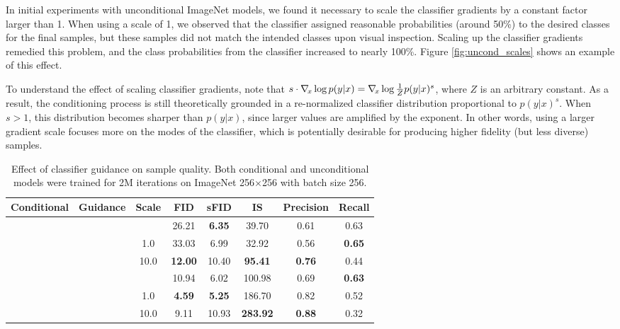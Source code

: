 \documentclass{article}
\newcommand{\cmark}{\ding{51}}%
\newcommand{\xmark}{\ding{55}}
\newcommand{\shortcite}[1]{[\citenum{#1}]}
\begin{document}
In initial experiments with unconditional ImageNet models, we found it necessary to scale the classifier gradients by a constant factor larger than 1. When using a scale of 1, we observed that the classifier assigned reasonable probabilities (around 50\%) to the desired classes for the final samples, but these samples did not match the intended classes upon visual inspection.
Scaling up the classifier gradients remedied this problem, and the class probabilities from the classifier increased to nearly 100\%. Figure \ref{fig:uncond_scales} shows an example of this effect.

To understand the effect of scaling classifier gradients, note that $s \cdot \grad_x \log p(y|x) = \grad_x \log \frac{1}{Z} p(y|x)^s$, where $Z$ is an arbitrary constant. As a result, the conditioning process is still theoretically grounded in a re-normalized classifier distribution proportional to $p(y|x)^s$. When $s > 1$, this distribution becomes sharper than $p(y|x)$, since larger values are amplified by the exponent. In other words, using a larger gradient scale focuses more on the modes of the classifier, which is potentially desirable for producing higher fidelity (but less diverse) samples.

\begin{table}[t]
    \begin{center}
    \begin{small}
    \begin{tabular}{cccccccc}
    \toprule
    Conditional & Guidance & Scale & FID   & sFID  & IS     & Precision & Recall  \\
    \midrule
    \xmark      & \xmark   &       & 26.21 & \bf 6.35  & 39.70  & 0.61      & 0.63 \\
    \xmark      & \cmark   & 1.0   & 33.03 & 6.99  & 32.92  & 0.56      & \bf 0.65 \\
    \xmark      & \cmark   & 10.0  & \bf 12.00 & 10.40 & \bf 95.41  & \bf 0.76      & 0.44 \\
    \hline
    \cmark      & \xmark   &       & 10.94 & 6.02  & 100.98 & 0.69      & \bf 0.63 \\ 
    \cmark      & \cmark   & 1.0   & \bf 4.59  & \bf 5.25  & 186.70 & 0.82      & 0.52 \\
    \cmark      & \cmark   & 10.0  & 9.11 &	10.93  & \bf 283.92  & \bf 0.88      & 0.32 \\
    \bottomrule
    \end{tabular}
    \end{small}
    \end{center}
    \caption{Effect of classifier guidance on sample quality. Both conditional and unconditional models were trained for 2M iterations on ImageNet 256$\times$256 with batch size 256.}
    \label{tab:guide}
    \vskip -0.2in
\end{table}
\end{document}
